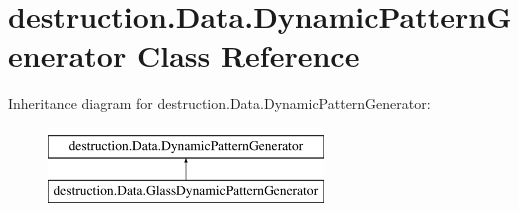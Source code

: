 \hypertarget{classdestruction_1_1_data_1_1_dynamic_pattern_generator}{\section{destruction.\-Data.\-Dynamic\-Pattern\-Generator Class Reference}
\label{classdestruction_1_1_data_1_1_dynamic_pattern_generator}
}
Inheritance diagram for destruction.\-Data.\-Dynamic\-Pattern\-Generator\-:\begin{figure}[H]
\begin{center}
\leavevmode
\includegraphics[height=2.000000cm]{classdestruction_1_1_data_1_1_dynamic_pattern_generator}
\end{center}
\end{figure}
